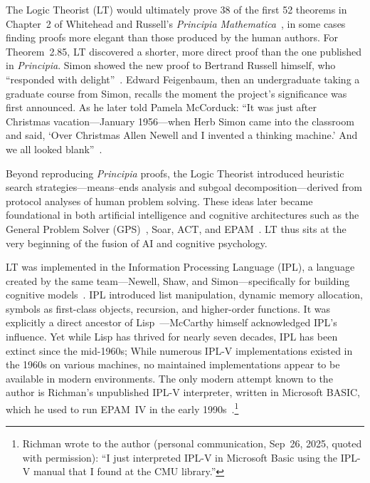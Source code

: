 \documentclass[journal]{IEEEtran}
\begin{document}
The Logic Theorist (LT)\cite{LT1956a} would ultimately prove 38 of the
first 52 theorems in Chapter~2 of Whitehead and Russell's
\textit{Principia Mathematica}~\cite{whitehead1910principia}, in some
cases finding proofs more elegant than those produced by the human
authors.  For Theorem~2.85, LT discovered a shorter, more direct proof
than the one published in \textit{Principia}.  Simon showed the new
proof to Bertrand Russell himself, who ``responded with
delight''~\cite[p.~167]{mccorduck2004machines}. Edward Feigenbaum,
then an undergraduate taking a graduate course from Simon,
recalls the moment the project's significance was first announced. As
he later told Pamela McCorduck: ``It was just after Christmas
vacation---January 1956---when Herb Simon came into the classroom and
said, `Over Christmas Allen Newell and I invented a thinking machine.'
And we all looked blank''~\cite[p.~138]{mccorduck2004machines}.

Beyond reproducing \textit{Principia} proofs, the Logic Theorist
introduced heuristic search strategies---means--ends analysis and
subgoal decomposition---derived from protocol analyses of human
problem solving. These ideas later became foundational in both
artificial intelligence and cognitive architectures such as the
General Problem Solver (GPS)~\cite{newell1959gps}, Soar, ACT, and
EPAM~\cite{feigenbaum1961epam}. LT thus sits at the very beginning of
the fusion of AI and cognitive psychology.

LT was implemented in the Information Processing Language (IPL), a
language created by the same team---Newell, Shaw, and
Simon---specifically for building cognitive
models~\cite{newell1964ipl}. IPL introduced list manipulation, dynamic
memory allocation, symbols as first-class objects, recursion, and
higher-order functions. It was explicitly a direct ancestor of
Lisp~\cite{mccarthy1960lisp}---McCarthy himself acknowledged IPL's
influence. Yet while Lisp has thrived for nearly seven decades, IPL
has been extinct since the mid-1960s; While numerous IPL-V
implementations existed in the 1960s on various machines, no
maintained implementations appear to be available in modern
environments.  The only modern attempt known to the author is
Richman's unpublished IPL-V interpreter, written in Microsoft BASIC,
which he used to run EPAM~IV in the early
1990s~\cite{richman1995epam}.\footnote{Richman wrote to the author
(personal communication, Sep~26, 2025, quoted with permission): ``I
just interpreted IPL-V in Microsoft Basic using the IPL-V manual that
I found at the CMU library.''}
\end{document}

